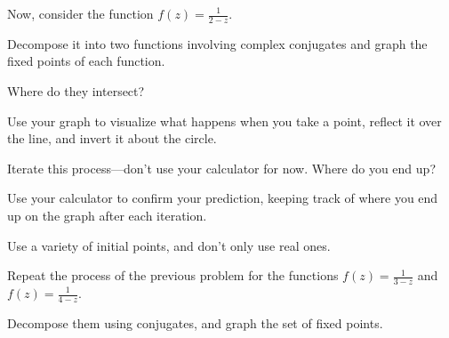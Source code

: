 \documentclass[../gatm_answers.tex]{subfiles}
\begin{document}
\begin{outer_problem}
\item Now, consider the function $f(z)=\frac{1}{2-z}$.
\end{outer_problem}

\begin{inner_problem}[start=1]
\item Decompose it into two functions involving complex conjugates and graph the fixed points of each function.
\end{inner_problem}

\begin{inner_problem}
\item Where do they intersect?
\end{inner_problem}

\begin{inner_problem}
\item Use your graph to visualize what happens when you take a point, reflect it over the line, and invert it about the circle.
\end{inner_problem}

\begin{inner_problem}
\item Iterate this process---don't use your calculator for now. Where do you end up?
\end{inner_problem}

\begin{inner_problem}
\item Use your calculator to confirm your prediction, keeping track of where you end up on the graph after each iteration.
\end{inner_problem}

\begin{inner_problem}
\item Use a variety of initial points, and don't only use real ones.
\end{inner_problem}

\begin{outer_problem}
\item Repeat the process of the previous problem for the functions $f(z)=\frac{1}{3-z}$ and $f(z)=\frac{1}{4-z}$.
\end{outer_problem}

\begin{inner_problem}[start=1]
\item Decompose them using conjugates, and graph the set of fixed points.
\end{inner_problem}
\end{document}
